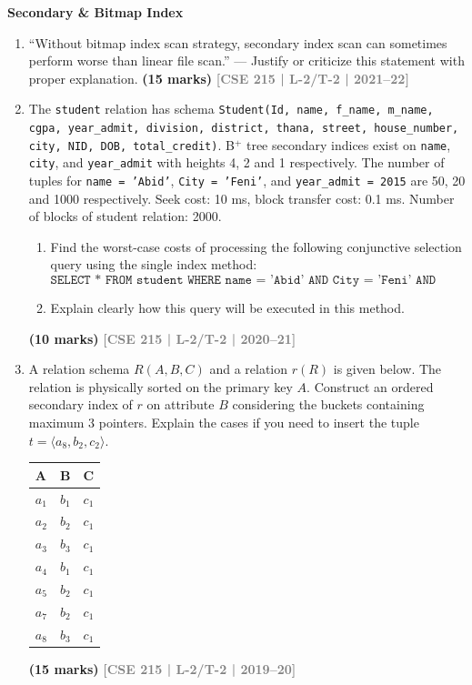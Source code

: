 \documentclass[12pt,a3paper]{article}
\newcommand{\yr}[1]{\hfill\textcolor{gray}{\small\textbf{[#1]}}}
\newcommand{\mk}[1]{\textcolor{orange!70!black}{\small\textbf{(#1 marks)}}}
\newcommand{\subtopic}[2]{%
  \vspace{10pt}
  \noindent\begin{tcolorbox}[colback=#1!8,colframe=#1,boxrule=0.6pt,arc=4pt,
    left=6pt,right=6pt,top=4pt,bottom=4pt]
    \small\bfseries\textcolor{#1}{#2}
  \end{tcolorbox}
  \vspace{2pt}
}
\begin{document}
\subtopic{cD}{Secondary \& Bitmap Index}
\label{sub:s5-secondary}

\begin{enumerate}

\item ``Without bitmap index scan strategy, secondary index scan can sometimes perform worse than linear file scan.'' --- Justify or criticize this statement with proper explanation.
\mk{15} \yr{CSE 215 | L-2/T-2 | 2021--22}

\item The \texttt{student} relation has schema \texttt{Student(Id, name, f\_name, m\_name, cgpa, year\_admit, division, district, thana, street, house\_number, city, NID, DOB, total\_credit)}. B$^+$ tree secondary indices exist on \texttt{name}, \texttt{city}, and \texttt{year\_admit} with heights 4, 2 and 1 respectively. The number of tuples for \texttt{name = 'Abid'}, \texttt{City = 'Feni'}, and \texttt{year\_admit = 2015} are 50, 20 and 1000 respectively. Seek cost: 10 ms, block transfer cost: 0.1 ms. Number of blocks of student relation: 2000.

\begin{enumerate}
  \item Find the worst-case costs of processing the following conjunctive selection query using the single index method:
  \[\texttt{SELECT * FROM student WHERE name = 'Abid' AND City = 'Feni' AND year\_admit = 2015}\]
  \item Explain clearly how this query will be executed in this method.
\end{enumerate}
 \mk{10} \yr{CSE 215 | L-2/T-2 | 2020--21}

\item A relation schema $R(A, B, C)$ and a relation $r(R)$ is given below. The relation is physically sorted on the primary key $A$. Construct an ordered secondary index of $r$ on attribute $B$ considering the buckets containing maximum 3 pointers. Explain the cases if you need to insert the tuple $t = \langle a_8, b_2, c_2 \rangle$.

\medskip
\begin{center}
\small
\begin{tabular}{lll}
\toprule
\textbf{A} & \textbf{B} & \textbf{C}\\
\midrule
$a_1$ & $b_1$ & $c_1$\\
$a_2$ & $b_2$ & $c_1$\\
$a_3$ & $b_3$ & $c_1$\\
$a_4$ & $b_1$ & $c_1$\\
$a_5$ & $b_2$ & $c_1$\\
$a_7$ & $b_2$ & $c_1$\\
$a_8$ & $b_3$ & $c_1$\\
\bottomrule
\end{tabular}
\end{center}
\mk{15} \yr{CSE 215 | L-2/T-2 | 2019--20}


\end{enumerate}
\end{document}
